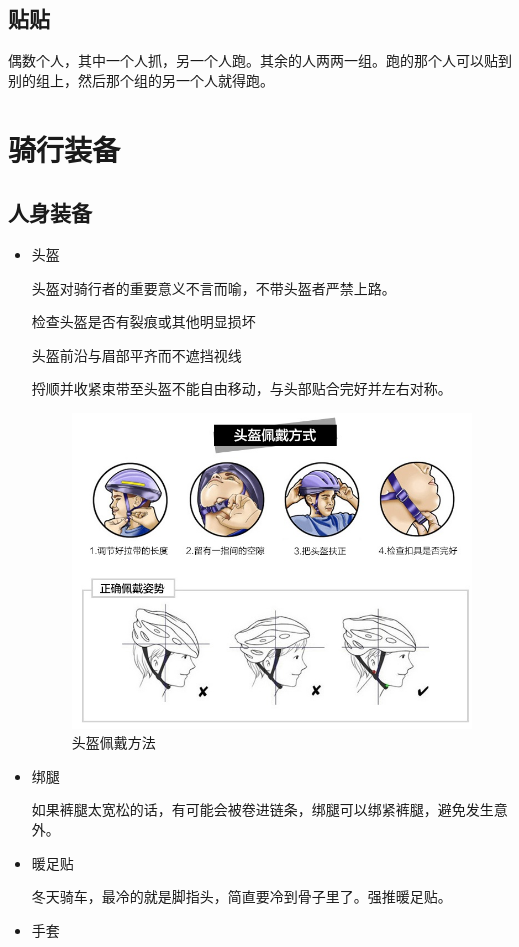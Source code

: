 \documentclass{ctexbook}
\begin{document}
\section{贴贴}

偶数个人，其中一个人抓，另一个人跑。其余的人两两一组。跑的那个人可以贴到别的组上，然后那个组的另一个人就得跑。

\newpage

\chapter{骑行装备}
\section{人身装备} 
    \begin{itemize}
        \item 头盔
    
        头盔对骑行者的重要意义不言而喻，不带头盔者严禁上路。
    
        检查头盔是否有裂痕或其他明显损坏
    
        头盔前沿与眉部平齐而不遮挡视线
    
        捋顺并收紧束带至头盔不能自由移动，与头部贴合完好并左右对称。
\begin{figure}[htp]
    \centering
    \includegraphics[width=0.7\linewidth]{fig/头盔佩戴方法.jpg}
    \caption{头盔佩戴方法}
\end{figure}

        \item 绑腿
        
        如果裤腿太宽松的话，有可能会被卷进链条，绑腿可以绑紧裤腿，避免发生意外。
        \item 暖足贴
        
        冬天骑车，最冷的就是脚指头，简直要冷到骨子里了。强推暖足贴。
        \item 手套    
    

\end{itemize}
\end{document}

